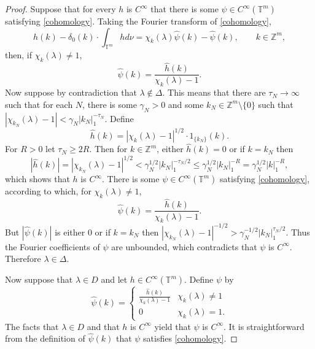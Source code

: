\documentclass{article}
\theoremstyle{definition}
\begin{document}
\begin{proof}
Suppose that for every $h$ is $C^\infty$ that there is some $\psi \in C^\infty(\mathbb{T}^m)$ satisfying \eqref{cohomology}.
Taking the Fourier transform of \eqref{cohomology},
\[
\widehat{h}(k) - \delta_0(k) \cdot \int_{\mathbb{T}^m} h d\nu = \chi_k(\lambda) \widehat{\psi}(k) - \widehat{\psi}(k),\qquad
k \in \mathbb{Z}^m,
\]
then, if $\chi_k(\lambda) \neq 1$,
\[
\widehat{\psi}(k) = \frac{\widehat{h}(k)}{\chi_k(\lambda)-1}.
\]
Now suppose by contradiction that
$\lambda \not \in \Delta$. 
This means that there are $\tau_N \to \infty$ such that for each $N$, there is some
$\gamma_N>0$ and some $k_N \in \mathbb{Z}^m \setminus \{0\}$ such that
$|\chi_{k_N}(\lambda)-1| < \gamma_N |k_N|_1^{-\tau_N}$. 
Define 
\[
\widehat{h}(k) = |\chi_k(\lambda)-1|^{1/2} \cdot 1_{\{k_N\}}(k).
\]
For $R>0$ let $\tau_N \geq 2R$. Then for $k \in \mathbb{Z}^m$, 
 either $\widehat{h}(k)=0$ or if $k=k_N$ then
\[
|\widehat{h}(k)| = |\chi_{k_N}(\lambda)-1|^{1/2} <\gamma_N^{1/2} |k_N|_1^{-\tau_N/2}
\leq \gamma_N^{1/2} |k_N|_1^{-R}
=\gamma_N^{1/2} |k|_1^{-R},
\]
which shows that $h$ is $C^\infty$. 
There is some $\psi \in C^\infty(\mathbb{T}^m)$ satisfying \eqref{cohomology}, according
to which, for $\chi_k(\lambda) \neq 1$,
\[
\widehat{\psi}(k) = \frac{\widehat{h}(k)}{\chi_k(\lambda)-1}.
\]
But  $|\widehat{\psi}(k)|$ is either $0$ or if $k=k_N$ then 
$|\chi_{k_N}(\lambda)-1|^{-1/2} > \gamma_N^{-1/2} |k_N|_1^{\tau_N/2}$. 
Thus the Fourier coefficients of $\psi$ are unbounded, which contradicts that
$\psi$ is $C^\infty$. Therefore $\lambda \in \Delta$. 

Now suppose that $\lambda \in D$ and let $h \in C^\infty(\mathbb{T}^m)$. 
Define $\psi$ by
\[
\widehat{\psi}(k) =\begin{cases}
\frac{\widehat{h}(k)}{\chi_k(\lambda)-1}&\chi_k(\lambda) \neq 1\\
0&\chi_k(\lambda)=1.
\end{cases}
\]
The facts that $\lambda \in D$ and that $h$ is $C^\infty$ yield that $\psi$ is $C^\infty$. It is straightforward
from the definition of $\widehat{\psi}(k)$ that $\psi$ satisfies \eqref{cohomology}.
\end{proof}
\end{document}
